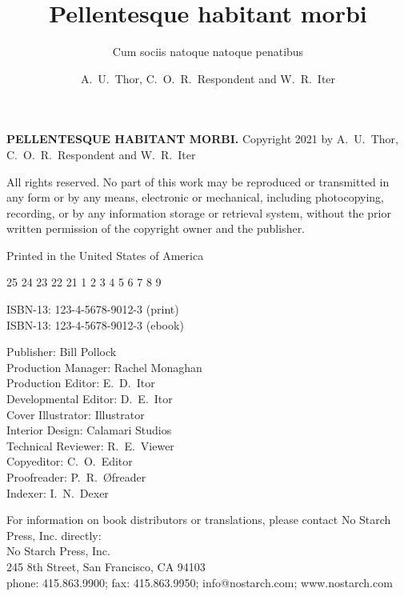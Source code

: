 \author{A.~U.~Thor, C.~O.~R.~Respondent and W.~R.~Iter}

\title{Pellentesque habitant morbi}

\subtitle{Cum sociis natoque natoque penatibus}


\makehalftitle

\maketitle


\begin{copyrightpage}
  \textbf{\sffamily\MakeUppercase{Pellentesque habitant morbi.}}
  Copyright \textcopyright{} 2021 by A.~U.~Thor, C.~O.~R.~Respondent
  and W.~R.~Iter

  All rights reserved. No part of this work may be reproduced or
  transmitted in any form or by any means, electronic or mechanical,
  including photocopying, recording, or by any information storage or
  retrieval system, without the prior written permission of the
  copyright owner and the publisher.

Printed in the United States of America

25 24 23 22 21 \hspace{0.5in}  1 2 3 4 5 6 7 8 9

ISBN-13: 123-4-5678-9012-3 (print)\\
ISBN-13: 123-4-5678-9012-3 (ebook)

Publisher: Bill Pollock\\
Production Manager: Rachel Monaghan\\
Production Editor: E.~D.~Itor\\
Developmental Editor: D.~E.~Itor\\
Cover Illustrator: Illustrator\\
Interior Design: Calamari Studios\\
Technical Reviewer: R.~E.~Viewer\\
Copyeditor: C.~O.~Editor\\
Proofreader: P.~R.~\O freader\\
Indexer: I.~N.~Dexer

For information on book distributors or translations, please contact
No Starch Press, Inc. directly: \\
No Starch Press, Inc.\\
245 8th Street, San Francisco, CA 94103\\
phone: 415.863.9900; fax: 415.863.9950; info@nostarch.com; www.nostarch.com\\


\end{copyrightpage}
